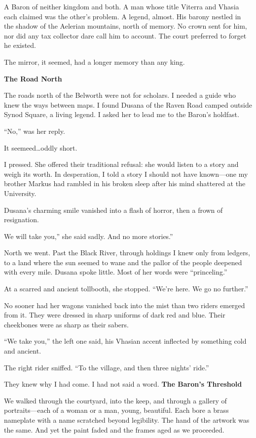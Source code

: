 \documentclass[11pt]{article}
\begin{document}
A Baron of neither kingdom and both. A man whose title Viterra and Vhasia each claimed was the other's problem. A legend, almost. His barony nestled in the shadow of the Aelerian mountains, north of memory. No crown sent for him, nor did any tax collector dare call him to account. The court preferred to forget he existed.

The mirror, it seemed, had a longer memory than any king.

\vspace{1em} \noindent \textbf{The Road North}

The roads north of the Belworth were not for scholars. I needed a guide who knew the ways between maps. I found Dusana of the Raven Road camped outside Synod Square, a living legend. I asked her to lead me to the Baron's holdfast.

``No,'' was her reply. 

It seemeed\dots oddly short.

I pressed. She offered their traditional refusal: she would listen to a story and weigh its worth. In desperation, I told a story I should not have known---one my brother Markus had rambled in his broken sleep after his mind shattered at the University.

Dusana's charming smile vanished into a flash of horror, then a frown of resignation.

We will take you,'' she said sadly. And no more stories.''

North we went. Past the Black River, through holdings I knew only from ledgers, to a land where the sun seemed to wane and the pallor of the people deepened with every mile. Dusana spoke little. Most of her words were ``princeling.''

At a scarred and ancient tollbooth, she stopped. ``We're here. We go no further.''

No sooner had her wagons vanished back into the mist than two riders emerged from it. They were dressed in sharp uniforms of dark red and blue. Their cheekbones were as sharp as their sabers.

``We take you,'' the left one said, his Vhasian accent inflected by something cold and ancient.

The right rider sniffed. ``To the village, and then three nights' ride.''

They knew why I had come. I had not said a word.
\vspace{1em}
\noindent
\textbf{The Baron's Threshold}

We walked through the courtyard, into the keep, and through a gallery of portraits---each of a woman or a man, young, beautiful. Each bore a brass nameplate with a name scratched beyond legibility. The hand of the artwork was the same. And yet the paint faded and the frames aged as we proceeded.
\end{document}
